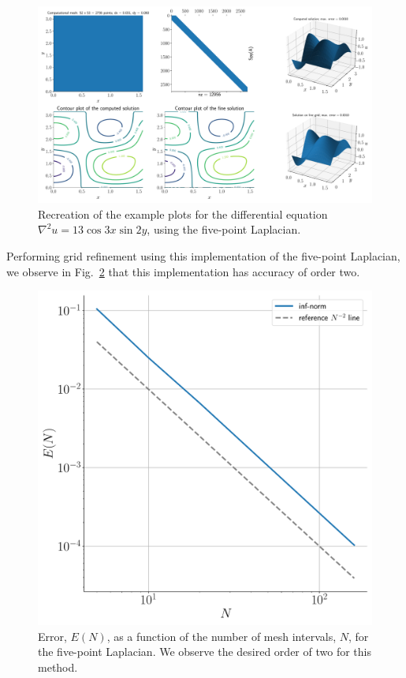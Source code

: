\documentclass[12pt]{article}
\begin{document}
\begin{figure}[!h]
	\centering
	\includegraphics[clip,scale=0.4]{q2a_figure.pdf}
	\caption{Recreation of the example plots for the differential equation $\nabla^{2}u = 13\cos3x\sin2y$, using the five-point Laplacian.}
	\label{fig:five_pt_soln_recreation}
\end{figure}

Performing grid refinement using this implementation of the five-point Laplacian, we observe in Fig.~\ref{fig:five_pt_err_scaling} that this implementation has accuracy of order two. 

\begin{figure}[!h]
	\centering
	\includegraphics[clip,scale=0.4]{q2a_err_fig.pdf}
	\caption{Error, $E(N)$, as a function of the number of mesh intervals, $N$, for the five-point Laplacian. We observe the desired order of two for this method.}
	\label{fig:five_pt_err_scaling}
\end{figure}
\end{document}
